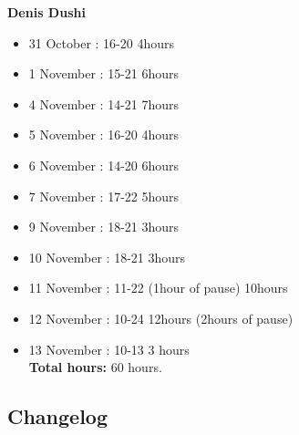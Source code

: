\textbf{Denis Dushi}
\begin{itemize}
\item 31 October : 16-20  4hours
\item 1 November : 15-21  6hours
\item 4 November : 14-21  7hours
\item 5 November : 16-20  4hours
\item 6 November : 14-20  6hours
\item 7 November : 17-22  5hours
\item 9 November : 18-21  3hours
\item 10 November : 18-21  3hours
\item 11 November : 11-22 (1hour of pause) 10hours
\item 12 November : 10-24  12hours (2hours of pause)
\item 13 November : 10-13 3 hours \\

\textbf{Total hours:} 60 hours.
\end{itemize}
\subsection{Changelog}